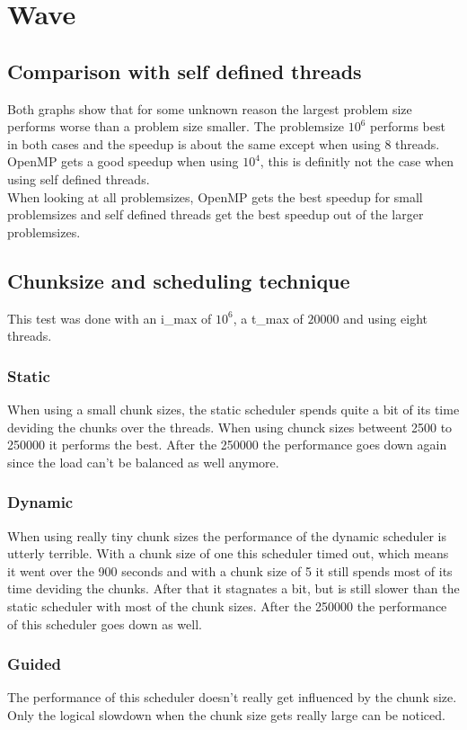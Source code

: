 \documentclass[12pt]{article}
\begin{document}
\maketitle
\section{Wave}
\subsection{Comparison with self defined threads}
Both graphs show that for some unknown reason the largest problem size performs worse than a problem size smaller. The problemsize $10^6$ performs best in both cases and the speedup is about the same except when using 8 threads.\\
OpenMP gets a good speedup when using $10^4$, this is definitly not the case when using self defined threads.\\
When looking at all problemsizes, OpenMP gets the best speedup for small problemsizes and self defined threads get the best speedup out of the larger problemsizes.
\subsection{Chunksize and scheduling technique}
This test was done with an i\_max of $10^6$, a t\_max of $20000$ and using eight threads.
\subsubsection{Static}
When using a small chunk sizes, the static scheduler spends quite a bit of its time deviding the chunks over the threads. When using chunck sizes betweent 2500 to 250000 it performs the best. After the 250000 the performance goes down again since the load can't be balanced as well anymore.
\subsubsection{Dynamic}
When using really tiny chunk sizes the performance of the dynamic scheduler is utterly terrible. With a chunk size of one this scheduler timed out, which means it went over the 900 seconds and with a chunk size of 5 it still spends most of its time deviding the chunks. After that it stagnates a bit, but is still slower than the static scheduler with most of the chunk sizes. After the 250000 the performance of this scheduler goes down as well.

\subsubsection{Guided}
The performance of this scheduler doesn't really get influenced by the chunk size. Only the logical slowdown when the chunk size gets really large can be noticed. 
\end{document}
